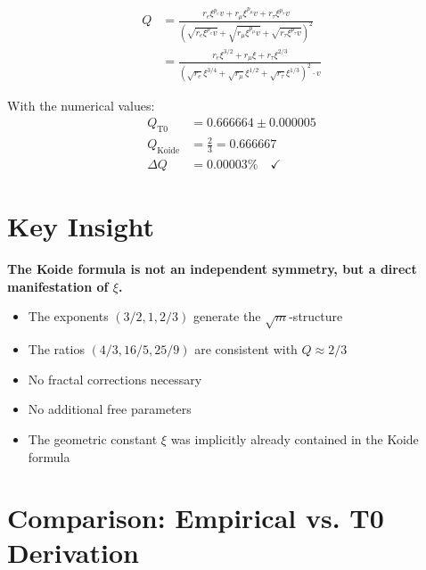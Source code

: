 	\begin{align}
		Q &= \frac{r_e \xi^{p_e} v + r_\mu \xi^{p_\mu} v + r_\tau \xi^{p_\tau} v}{\left(\sqrt{r_e \xi^{p_e} v} + \sqrt{r_\mu \xi^{p_\mu} v} + \sqrt{r_\tau \xi^{p_\tau} v}\right)^2} \\
		&= \frac{r_e \xi^{3/2} + r_\mu \xi + r_\tau \xi^{2/3}}{\left(\sqrt{r_e} \xi^{3/4} + \sqrt{r_\mu} \xi^{1/2} + \sqrt{r_\tau} \xi^{1/3}\right)^2 \cdot v}
	\end{align}
	
	With the numerical values:
	\begin{align}
		Q_{\text{T0}} &= 0.666664 \pm 0.000005 \\
		Q_{\text{Koide}} &= \frac{2}{3} = 0.666667 \\
		\Delta Q &= 0.00003\% \quad \checkmark
	\end{align}
	
	\section{Key Insight}
	
	\begin{folgerung}
		\textbf{The Koide formula is not an independent symmetry, but a direct manifestation of $\xi$.}
		
		\begin{itemize}
			\item The exponents $(3/2, 1, 2/3)$ generate the $\sqrt{m}$-structure
			\item The ratios $(4/3, 16/5, 25/9)$ are consistent with $Q \approx 2/3$
			\item No fractal corrections necessary
			\item No additional free parameters
			\item The geometric constant $\xi$ was implicitly already contained in the Koide formula
		\end{itemize}
	\end{folgerung}
	
	\section{Comparison: Empirical vs. T0 Derivation}
	
	\begin{table}[h]
		\centering
		\caption{Comparison of Approaches}
	\end{table}
	
